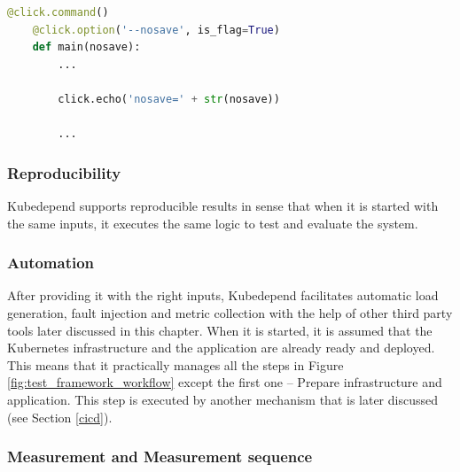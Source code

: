 \vspace{0.5cm}
\begin{minipage}{\linewidth}
	\begin{lstlisting}[language=python, caption={Define a parameter to control saving test results (simplified extract)}, label={lst:click-option}]
	@click.command()
	@click.option('--nosave', is_flag=True)
	def main(nosave):
		...
	
		click.echo('nosave=' + str(nosave))
		
		...\end{lstlisting}
\end{minipage}

\subsubsection{Reproducibility}

Kubedepend supports reproducible results in sense that when it is started with the same inputs, it executes the same logic to test and evaluate the system. 

\subsubsection{Automation}

After providing it with the right inputs, Kubedepend facilitates automatic load generation, fault injection and metric collection with the help of other third party tools later discussed in this chapter. When it is started, it is assumed that the Kubernetes infrastructure and the application are already ready and deployed. This means that it practically manages all the steps in Figure \ref{fig:test_framework_workflow} except the first one -- Prepare infrastructure and application. This step is executed by another mechanism that is later discussed (see Section \ref{cicd}).

\subsubsection{Measurement and Measurement sequence} \label{test-impl-measurement-seq}

